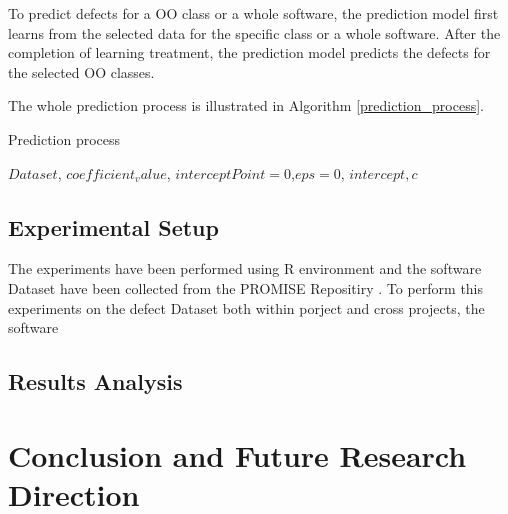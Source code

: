 \documentclass[12pt]{report}
\begin{document}
To predict defects for a OO class or a whole software, the prediction model first learns from the selected data for the specific class or a whole software. After the completion of learning treatment, the prediction model predicts the defects for the selected OO classes.

The whole prediction process is illustrated in Algorithm \ref{prediction_process}.

\begin{algorithm}
	\caption{Prediction process}
	\label{prediction_process}
		\begin{algorithmic}[1]
			\REQUIRE  $ Dataset$, $coefficient_value$, $interceptPoint=0$,$eps=0$, $intercept, c$
			
			\ENDFOR
		\end{algorithmic}
	\end{algorithm}

\section{Experimental Setup}
The experiments have been performed using R environment \cite{survival-package} and the software Dataset have been collected from the PROMISE Repositiry \cite{promise12}.
To perform this experiments on the defect Dataset both within porject and cross projects, the software 
\section{Results Analysis}



\chapter{Conclusion and Future Research Direction}


\begin{singlespace}


\end{singlespace}
\end{document}
